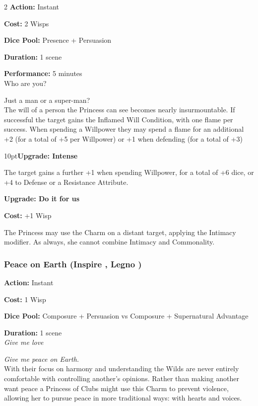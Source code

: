 \begin{multicols}{2}
\noindent \textbf{Action:} Instant

\noindent \textbf{Cost:} 2 Wisps

\noindent \textbf{Dice Pool:} Presence + Persuasion

\noindent \textbf{Duration:} 1 scene 

\noindent \textbf{Performance:} 5 minutes \\

\noindent Who are you? 

\noindent Just a man or a super-man?\\

The will of a person the Princess can see becomes nearly insurmountable. If successful the target gains the Inflamed Will Condition, with one flame per success. When spending a Willpower they may spend a flame for an additional +2 (for a total of +5 per Willpower) or +1 when defending (for a total of +3)

\begin{myindentpar}{10pt}\textbf{Upgrade: Intense}

The target gains a further +1 when spending Willpower, for a total of +6 dice, or +4 to Defense or a Resistance Attribute.

\textbf{Upgrade: Do it for us}

\noindent \textbf{Cost:} +1 Wisp

The Princess may use the Charm on a distant target, applying the Intimacy modifier. As always, she cannot combine Intimacy and Commonality.\end{myindentpar}

\subsubsection*{Peace on Earth (Inspire \textbullet\textbullet\textbullet, Legno \textbullet\textbullet)}

\noindent \textbf{Action:} Instant

\noindent \textbf{Cost:} 1 Wisp

\noindent \textbf{Dice Pool:} Composure + Persuasion vs Composure + Supernatural Advantage

\noindent \textbf{Duration:} 1 scene \\

\noindent \textit{Give me love}

\textit{Give me peace on Earth.} \\

\noindent With their focus on harmony and understanding the Wilds are never entirely comfortable with controlling another's opinions. Rather than making another want peace a Princess of Clubs might use this Charm to prevent violence, allowing her to pursue peace in more traditional ways: with hearts and voices.


\end{multicols}
